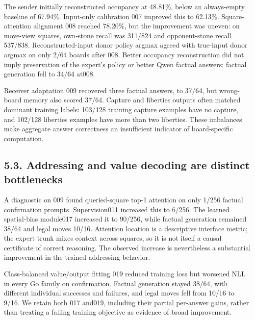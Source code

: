 \documentclass[11pt]{article}
\begin{document}
The sender initially reconstructed occupancy at 48.81\%, below an always-empty baseline of 67.94\%. Input-only calibration 007 improved this to 62.13\%. Square-attention alignment 008 reached 78.20\%, but the improvement was uneven: on move-view squares, own-stone recall was 311/824 and opponent-stone recall 537/838. Reconstructed-input donor policy argmax agreed with true-input donor argmax on only 2/64 boards after 008. Better occupancy reconstruction did not imply preservation of the expert's policy or better Qwen factual answers; factual generation fell to 34/64 at008.

Receiver adaptation 009 recovered three factual answers, to 37/64, but wrong-board memory also scored 37/64. Capture and liberties outputs often matched dominant training labels: 103/128 training capture examples have no capture, and 102/128 liberties examples have more than two liberties. These imbalances make aggregate answer correctness an insufficient indicator of board-specific computation.

\subsection*{5.3. Addressing and value decoding are distinct bottlenecks}
A diagnostic on 009 found queried-square top-1 attention on only 1/256 factual confirmation prompts. Supervision011 increased this to 6/256. The learned spatial-bias module017 increased it to 90/256, while factual generation remained 38/64 and legal moves 10/16. Attention location is a descriptive interface metric; the expert trunk mixes context across squares, so it is not itself a causal certificate of correct reasoning. The observed increase is nevertheless a substantial improvement in the trained addressing behavior.

Class-balanced value/output fitting 019 reduced training loss but worsened NLL in every Go family on confirmation. Factual generation stayed 38/64, with different individual successes and failures, and legal moves fell from 10/16 to 9/16. We retain both 017 and019, including their partial per-answer gains, rather than treating a falling training objective as evidence of broad improvement.
\end{document}
